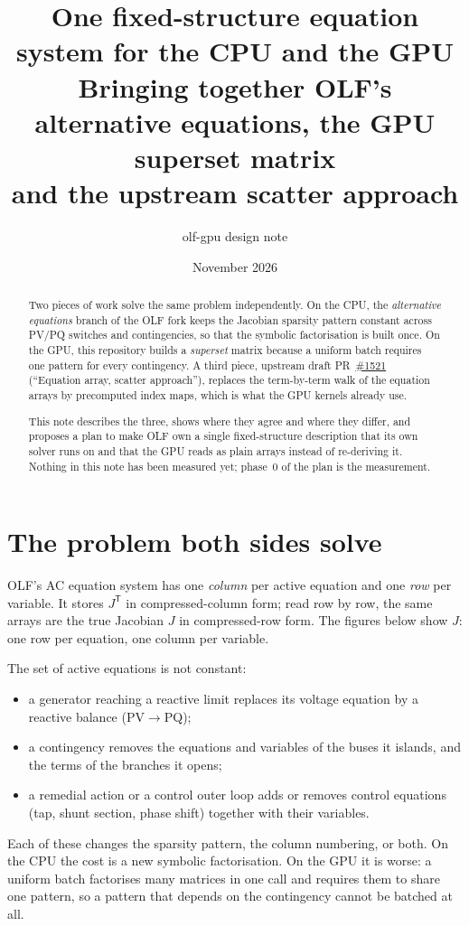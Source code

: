 \documentclass[11pt,a4paper]{article}
\title{One fixed-structure equation system for the CPU and the GPU\\[4pt]
\large Bringing together OLF's alternative equations, the GPU superset matrix\\ and the upstream scatter approach}
\author{olf-gpu design note}
\date{November 2026}
\begin{document}
\maketitle

\begin{abstract}
\noindent Two pieces of work solve the same problem independently. On the CPU, the
\emph{alternative equations} branch of the OLF fork keeps the Jacobian sparsity pattern
constant across PV/PQ switches and contingencies, so that the symbolic factorisation is
built once. On the GPU, this repository builds a \emph{superset} matrix because a uniform
batch requires one pattern for every contingency. A third piece, upstream draft
PR~\href{https://github.com/powsybl/powsybl-open-loadflow/pull/1521}{\#1521}
(``Equation array, scatter approach''), replaces the term-by-term walk of the equation
arrays by precomputed index maps, which is what the GPU kernels already use.

This note describes the three, shows where they agree and where they differ, and proposes
a plan to make OLF own a single fixed-structure description that its own solver runs on
and that the GPU reads as plain arrays instead of re-deriving it.
Nothing in this note has been measured yet; phase~0 of the plan is the measurement.
\end{abstract}

\tableofcontents
\newpage

\section{The problem both sides solve}

OLF's AC equation system has one \emph{column} per active equation and one \emph{row} per
variable. It stores $J^{\mathsf T}$ in compressed-column form; read row by row, the same
arrays are the true Jacobian $J$ in compressed-row form. The figures below show $J$: one
row per equation, one column per variable.

The set of active equations is not constant:
\begin{itemize}
\item a generator reaching a reactive limit replaces its voltage equation by a reactive
      balance (PV$\to$PQ);
\item a contingency removes the equations and variables of the buses it islands, and the
      terms of the branches it opens;
\item a remedial action or a control outer loop adds or removes control equations
      (tap, shunt section, phase shift) together with their variables.
\end{itemize}
Each of these changes the sparsity pattern, the column numbering, or both. On the CPU the
cost is a new symbolic factorisation. On the GPU it is worse: a uniform batch factorises
many matrices in one call and requires them to share one pattern, so a pattern that
depends on the contingency cannot be batched at all.
\end{document}

